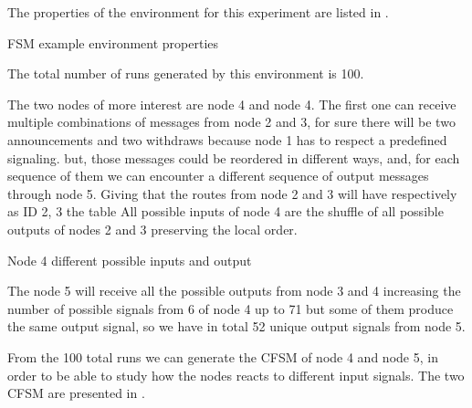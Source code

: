 The properties of the environment for this experiment are listed in .

\begin{table}[h]
	
	\caption{FSM example environment properties}
	\label{tbl:fig_4_example}
\end{table}

The total number of runs generated by this environment is \num{100}.

The two nodes of more interest are node \num{4} and node \num{4}.
The first one can receive multiple combinations of messages from node \num{2} and
\num{3}, for sure there will be two announcements and two withdraws because node
1 has to respect a predefined signaling. but, those messages could be reordered
in different ways, and, for each sequence of them we can encounter a different
sequence of output messages through node \num{5}.
Giving that the routes from node \num{2} and \num{3} will have respectively as 
ID \num{2}, \num{3} the table 
All possible inputs of node \num{4} are the shuffle of all possible
outputs of nodes \num{2} and \num{3} preserving the local order.

\begin{table}[h]
	
	\caption{Node 4 different possible inputs and output}
	\label{tbl:fig_4_node4_possible_inputs}
\end{table}

The node \num{5} will receive all the possible outputs from node \num{3} and 
\num{4} increasing the number of possible signals from \num{6} of node \num{4}
up to \num{71} but some of them produce the same output signal, so we have in 
total \num{52} unique output signals from node \num{5}.

From the \num{100} total runs we can generate the \ac{CFSM} of node \num{4} and
node \num{5}, in order to be able to study how the nodes reacts to different
input signals.
The two \ac{CFSM} are presented in .

